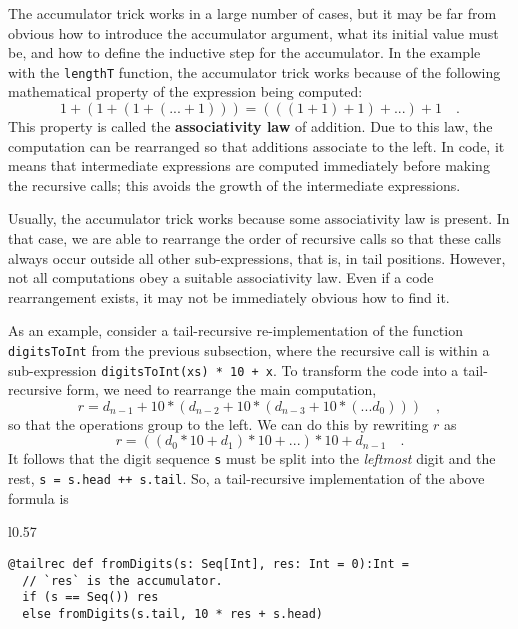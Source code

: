 The accumulator trick works in a large number of cases, but it may
be far from obvious how to introduce the accumulator argument, what
its initial value must be, and how to define the inductive step for
the accumulator. In the example with the \lstinline!lengthT! function,
the accumulator trick works because of the following mathematical
property of the expression being computed:
\[
1+\left(1+\left(1+\left(...+1\right)\right)\right)=\left(\left(\left(1+1\right)+1\right)+...\right)+1\quad.
\]
This property is called the \textbf{associativity
law} of addition. Due to this law, the computation can be rearranged
so that additions associate to the left. In code, it means that intermediate
expressions are computed immediately before making the recursive calls;
this avoids the growth of the intermediate expressions. 

Usually, the accumulator trick works because some associativity law
is present. In that case, we are able to rearrange the order of recursive
calls so that these calls always occur outside all other sub-expressions,
\textendash{} that is, in tail positions. However, not all computations
obey a suitable associativity law. Even if a code rearrangement exists,
it may not be immediately obvious how to find it.

As an example, consider a tail-recursive re-implementation of the
function \lstinline!digitsToInt! from the previous subsection, where
the recursive call is within a sub-expression \lstinline!digitsToInt(xs) * 10 + x!.
To transform the code into a tail-recursive form, we need to rearrange
the main computation,
\[
r=d_{n-1}+10*\left(d_{n-2}+10*\left(d_{n-3}+10*\left(...d_{0}\right)\right)\right)\quad,
\]
so that the operations group to the left. We can do this by rewriting
$r$ as
\[
r=\left(\left(d_{0}*10+d_{1}\right)*10+...\right)*10+d_{n-1}\quad.
\]
It follows that the digit sequence \lstinline!s! must be split into
the \emph{leftmost} digit and the rest, \lstinline!s = s.head ++ s.tail!.
So, a tail-recursive implementation of the above formula is

\begin{wrapfigure}{l}{0.57\columnwidth}%
\vspace{-0.9\baselineskip}
\begin{lstlisting}
@tailrec def fromDigits(s: Seq[Int], res: Int = 0):Int =
  // `res` is the accumulator.
  if (s == Seq()) res
  else fromDigits(s.tail, 10 * res + s.head)
\end{lstlisting}

\vspace{-1.5\baselineskip}
\end{wrapfigure}%

